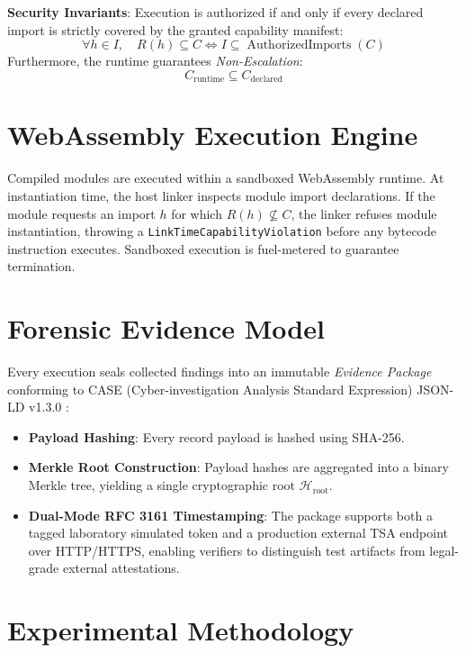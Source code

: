 \documentclass[10pt,conference]{IEEEtran}
\begin{document}
\textbf{Security Invariants}:
Execution is authorized if and only if every declared import is strictly covered by the granted capability manifest:
\begin{equation}
\forall h \in I, \quad R(h) \subseteq C \iff I \subseteq \operatorname{AuthorizedImports}(C)
\end{equation}
Furthermore, the runtime guarantees \textit{Non-Escalation}:
\begin{equation}
C_{\text{runtime}} \subseteq C_{\text{declared}}
\end{equation}

\section{WebAssembly Execution Engine}
Compiled modules are executed within a sandboxed WebAssembly runtime. At instantiation time, the host linker inspects module import declarations. If the module requests an import $h$ for which $R(h) \not\subseteq C$, the linker refuses module instantiation, throwing a \texttt{LinkTimeCapabilityViolation} before any bytecode instruction executes. Sandboxed execution is fuel-metered to guarantee termination.

\section{Forensic Evidence Model}
Every execution seals collected findings into an immutable \textit{Evidence Package} conforming to CASE (Cyber-investigation Analysis Standard Expression) JSON-LD v1.3.0 \cite{casey2018case}:
\begin{itemize}
    \item \textbf{Payload Hashing}: Every record payload is hashed using SHA-256.
    \item \textbf{Merkle Root Construction}: Payload hashes are aggregated into a binary Merkle tree, yielding a single cryptographic root $\mathcal{H}_{\text{root}}$.
    \item \textbf{Dual-Mode RFC 3161 Timestamping}: The package supports both a tagged laboratory simulated token and a production external TSA endpoint over HTTP/HTTPS, enabling verifiers to distinguish test artifacts from legal-grade external attestations.
\end{itemize}

\section{Experimental Methodology}
\end{document}

